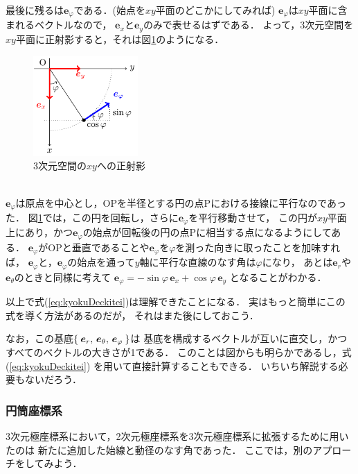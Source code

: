 最後に残るは$\bm{e}_\varphi$である．(始点を$xy$平面のどこかにしてみれば)
$\bm{e}_\varphi$は$xy$平面に含まれるベクトルなので，
$\bm{e}_x$と$\bm{e}_y$のみで表せるはずである．
よって，3次元空間を$xy$平面に正射影すると，それは図\ref{fig:3dxy-varphi}のようになる．
\begin{figure}[h]
 \begin{center}
 \includegraphics[width=4cm]{picture/vecter28.pdf}
 \caption{3次元空間の$xy$への正射影}
\label{fig:3dxy-varphi}
 \end{center}
\end{figure}
\\
$\bm{e}_\varphi$は原点を中心とし，OPを半径とする円の点Pにおける接線に平行なのであった．
図\ref{fig:3dxy-varphi}では，この円を回転し，さらに$\bm{e}_\varphi$を平行移動させて，
この円が$xy$平面上にあり，かつ$\bm{e}_\varphi$の始点が回転後の円の点Pに相当する点になるようにしてある．
$\bm{e}_\varphi$がOPと垂直であることや$\bm{e}_\varphi$を$\varphi$を測った向きに取ったことを加味すれば，
$\bm{e}_\varphi$と，$\bm{e}_\varphi$の始点を通って$y$軸に平行な直線のなす角は$\varphi$になり，
あとは$\bm{e}_r$や$\bm{e}_\theta$のときと同様に考えて
$\bm{e}_\varphi= - \sin \varphi \, \bm{e}_x + \cos \varphi \, \bm{e}_y$
となることがわかる．

以上で式(\ref{eq:kyokuDeckitei})は理解できたことになる．
実はもっと簡単にこの式を導く方法があるのだが，
それはまた後にしておこう．

なお，この基底$\Set{ \bm{e}_r , \, \bm{e}_\theta , \, \bm{e}_\varphi}$は
基底を構成するベクトルが互いに直交し，かつすべてのベクトルの大きさが1である．
このことは図からも明らかであるし，式(\ref{eq:kyokuDeckitei})
を用いて直接計算することもできる．
いちいち解説する必要もないだろう．

\subsubsection{円筒座標系}
3次元極座標系において，2次元極座標系を3次元極座標系に拡張するために用いたのは
新たに追加した始線と動径のなす角であった．
ここでは，別のアプローチをしてみよう．

